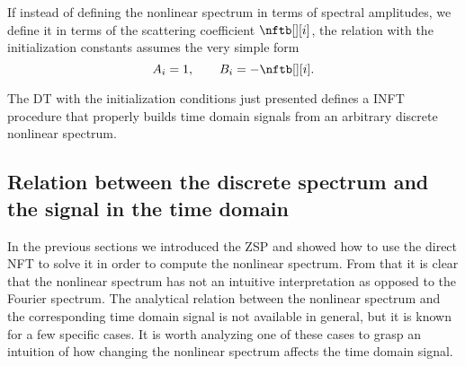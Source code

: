 If instead of defining the nonlinear spectrum in terms of spectral amplitudes,
we define it in terms of the scattering coefficient $\nftb[][i]$, the relation
with the initialization constants assumes the very simple form
\begin{equation}
  A_i = 1, \qquad B_i = - \nftb[][i].
\end{equation}

The \ac{DT} with the initialization conditions just presented defines a \ac{INFT} procedure that properly builds time domain signals from an arbitrary discrete nonlinear spectrum.



\subsection{Relation between the discrete spectrum and the
signal in the time domain}\label{sec:spectrum_signal_relation}
In the previous sections we introduced the \ac{ZSP} and showed how to use
the direct \ac{NFT} to solve it in order to compute the nonlinear spectrum. From
that it is clear that the nonlinear spectrum has not an intuitive interpretation
as opposed to the  Fourier spectrum. The analytical relation between the nonlinear spectrum
and the corresponding time domain signal is not available in general, but it is
known for a few specific cases. It is worth analyzing  one of these
cases to grasp an intuition of how changing the nonlinear spectrum affects the
time domain signal.

